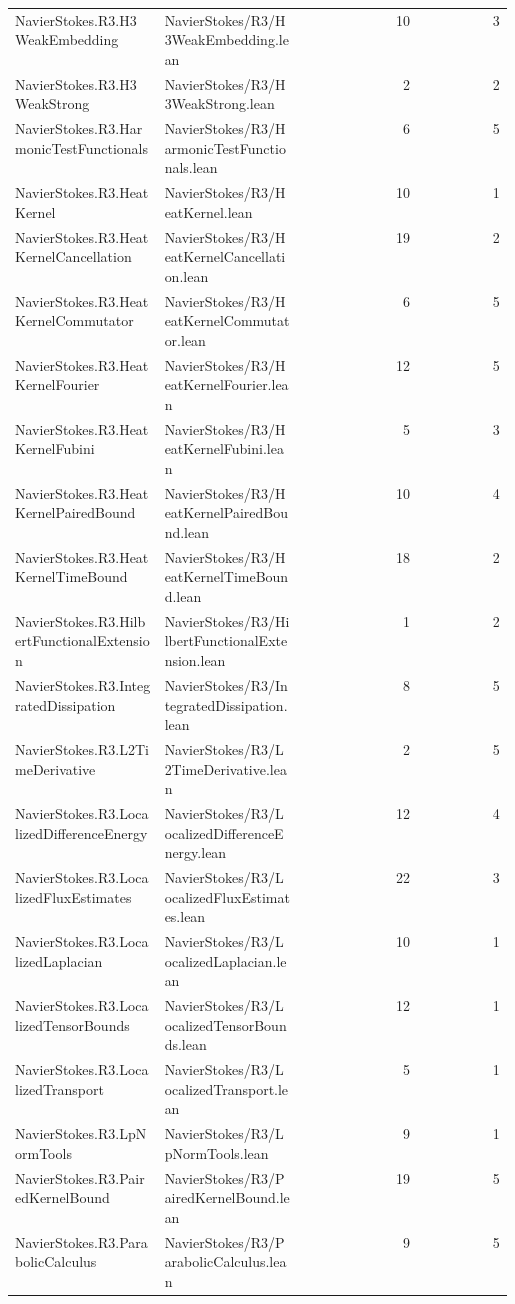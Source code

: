 \begin{longtable}{p{0.30\linewidth}p{0.28\linewidth}rr}
NavierStokes.R3.H3WeakEmbedding & NavierStokes/R3/H3WeakEmbedding.lean & 10 & 3\\
NavierStokes.R3.H3WeakStrong & NavierStokes/R3/H3WeakStrong.lean & 2 & 2\\
NavierStokes.R3.HarmonicTestFunctionals & NavierStokes/R3/HarmonicTestFunctionals.lean & 6 & 5\\
NavierStokes.R3.HeatKernel & NavierStokes/R3/HeatKernel.lean & 10 & 1\\
NavierStokes.R3.HeatKernelCancellation & NavierStokes/R3/HeatKernelCancellation.lean & 19 & 2\\
NavierStokes.R3.HeatKernelCommutator & NavierStokes/R3/HeatKernelCommutator.lean & 6 & 5\\
NavierStokes.R3.HeatKernelFourier & NavierStokes/R3/HeatKernelFourier.lean & 12 & 5\\
NavierStokes.R3.HeatKernelFubini & NavierStokes/R3/HeatKernelFubini.lean & 5 & 3\\
NavierStokes.R3.HeatKernelPairedBound & NavierStokes/R3/HeatKernelPairedBound.lean & 10 & 4\\
NavierStokes.R3.HeatKernelTimeBound & NavierStokes/R3/HeatKernelTimeBound.lean & 18 & 2\\
NavierStokes.R3.HilbertFunctionalExtension & NavierStokes/R3/HilbertFunctionalExtension.lean & 1 & 2\\
NavierStokes.R3.IntegratedDissipation & NavierStokes/R3/IntegratedDissipation.lean & 8 & 5\\
NavierStokes.R3.L2TimeDerivative & NavierStokes/R3/L2TimeDerivative.lean & 2 & 5\\
NavierStokes.R3.LocalizedDifferenceEnergy & NavierStokes/R3/LocalizedDifferenceEnergy.lean & 12 & 4\\
NavierStokes.R3.LocalizedFluxEstimates & NavierStokes/R3/LocalizedFluxEstimates.lean & 22 & 3\\
NavierStokes.R3.LocalizedLaplacian & NavierStokes/R3/LocalizedLaplacian.lean & 10 & 1\\
NavierStokes.R3.LocalizedTensorBounds & NavierStokes/R3/LocalizedTensorBounds.lean & 12 & 1\\
NavierStokes.R3.LocalizedTransport & NavierStokes/R3/LocalizedTransport.lean & 5 & 1\\
NavierStokes.R3.LpNormTools & NavierStokes/R3/LpNormTools.lean & 9 & 1\\
NavierStokes.R3.PairedKernelBound & NavierStokes/R3/PairedKernelBound.lean & 19 & 5\\
NavierStokes.R3.ParabolicCalculus & NavierStokes/R3/ParabolicCalculus.lean & 9 & 5\\

\end{longtable}
